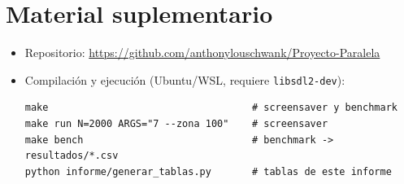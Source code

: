 \documentclass[11pt,letterpaper]{article}
\newcommand{\codigo}[1]{\texttt{#1}}
\begin{document}
\section{Material suplementario}

\begin{itemize}
  \item Repositorio: \url{https://github.com/anthonylouschwank/Proyecto-Paralela}
  \item Compilación y ejecución (Ubuntu/WSL, requiere \codigo{libsdl2-dev}):
\begin{lstlisting}
make                                   # screensaver y benchmark
make run N=2000 ARGS="7 --zona 100"    # screensaver
make bench                             # benchmark -> resultados/*.csv
python informe/generar_tablas.py       # tablas de este informe
\end{lstlisting}
\end{itemize}
\end{document}
